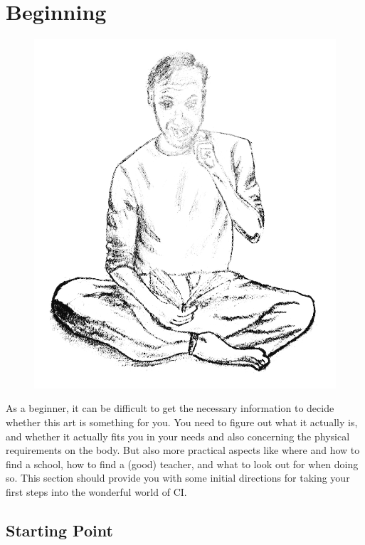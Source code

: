 \chapter{Beginning}\label{ch:beginning}

\begin{figure}[h]
    \begin{center}
    {\includegraphics[width=0.3\paperwidth]{images/testpic}}
    \end{center}\label{img:beginning}
\end{figure}

As a beginner, it can be difficult to get the necessary information to decide whether this art is something for you.
You need to figure out what it actually is, and whether it actually fits you in your needs and also concerning the physical requirements on the body.
But also more practical aspects like where and how to find a school, how to find a (good) teacher, and what to look out for when doing so.
This section should provide you with some initial directions for taking your first steps into the wonderful world of CI\@.

\section{Starting Point}\label{sec:starting-point}

